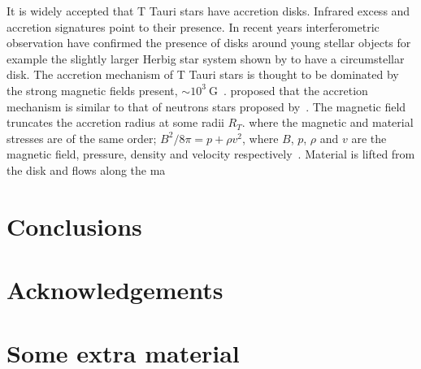\documentclass[fleqn,usenatbib]{mnras}
\begin{document}
It is widely accepted that T Tauri stars have
accretion disks. Infrared excess and accretion
signatures point to their presence. In recent years
interferometric observation have confirmed the
presence of disks around young stellar objects for
example the slightly larger Herbig star system shown
by \cite{2012ApJ...752...11K} to have a circumstellar
disk. The accretion mechanism of T Tauri stars is
thought to be dominated by the strong magnetic fields
present, $\sim 10^{3}~\textrm{G}$~\citep{2012MNRAS.426.2901K}.
\citet{1991ApJ...370L..39K} proposed that the accretion mechanism is
similar to that of neutrons stars proposed
by~\citet{1977ApJ...217..578G}. The magnetic field truncates the
accretion radius at some radii $R_T$. where the magnetic and material
stresses are of the same order; $B^2/8\pi = p + \rho v^2$, where $B$,
$p$, $\rho$ and $v$ are the magnetic field, pressure, density and
velocity respectively~\citep{Romanova:2002hc}. Material is lifted from the disk and flows along the ma 











\section{Conclusions}

\section*{Acknowledgements}









\appendix

\section{Some extra material}



\bsp	%
\label{lastpage}
\end{document}
